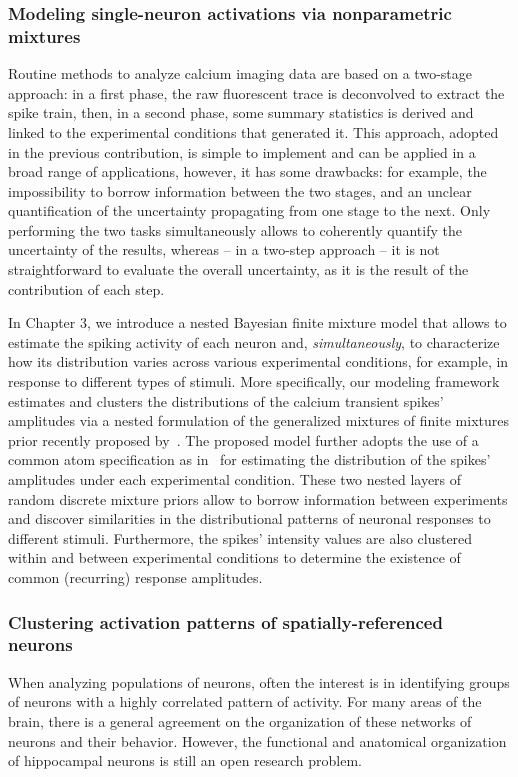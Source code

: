 \subsubsection{Modeling single-neuron activations via nonparametric mixtures}
Routine methods to analyze calcium imaging data are based on a two-stage approach: in a first phase, the raw fluorescent trace is deconvolved to extract the spike train, then, in a second phase, some summary statistics is derived and linked to the experimental conditions that generated it. 
This approach, adopted in the previous contribution, is simple to implement and can be applied in a broad range of applications, however, it has some drawbacks: for example, the impossibility to borrow information between the two stages, and an unclear quantification of the uncertainty propagating from one stage to the next. Only performing the two tasks simultaneously allows to coherently quantify the uncertainty of the results, whereas -- in a two-step approach -- it is not straightforward to evaluate the overall uncertainty, as it is the result of the contribution of each step. 

In Chapter 3, we introduce a nested Bayesian finite mixture model that allows to estimate the spiking activity of each neuron and, \textit{simultaneously}, to characterize how its distribution varies across various experimental conditions, for example, in response to different types of stimuli.
More specifically, our modeling framework estimates and clusters the distributions of the calcium transient spikes’ amplitudes via a nested formulation of the generalized mixtures of finite mixtures prior recently proposed by~\textcite{fruhwirthschnatter2020}. The proposed model further adopts the use of a common atom specification as in~\textcite{denti2021} for estimating the distribution of the spikes’ amplitudes under each experimental condition. 
These two nested layers of random discrete mixture priors allow to borrow information between experiments and discover similarities in the distributional patterns of neuronal responses to different stimuli. Furthermore, the spikes’ intensity values are also clustered within and between experimental conditions to determine the existence of common (recurring) response amplitudes.




\subsubsection{Clustering activation patterns of spatially-referenced neurons}
When analyzing populations of neurons, often the interest is in identifying groups of neurons with a highly correlated pattern of activity. For many areas of the brain, there is a general agreement on the organization of these networks of neurons and their behavior.
However, the functional and anatomical organization of hippocampal neurons is still an open research problem. 

